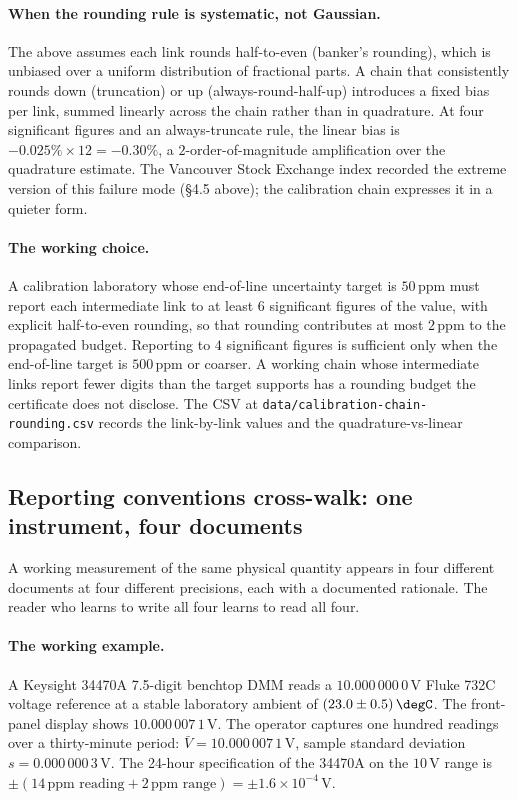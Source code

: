 \paragraph{When the rounding rule is systematic, not Gaussian.}
The above assumes each link rounds half-to-even (banker's
rounding), which is unbiased over a uniform distribution of
fractional parts. A chain that consistently rounds down
(truncation) or up (always-round-half-up) introduces a fixed
bias per link, summed linearly across the chain rather than in
quadrature. At four significant figures and an always-truncate
rule, the linear bias is $-0.025\% \times 12 = -0.30\%$, a
$2$-order-of-magnitude amplification over the quadrature
estimate. The Vancouver Stock Exchange index recorded the
extreme version of this failure mode (\S 4.5 above); the
calibration chain expresses it in a quieter form.

\paragraph{The working choice.} A calibration laboratory whose
end-of-line uncertainty target is $50\,\text{ppm}$ must report
each intermediate link to at least $6$ significant figures of
the value, with explicit half-to-even rounding, so that
rounding contributes at most $2\,\text{ppm}$ to the propagated
budget. Reporting to $4$ significant figures is sufficient only
when the end-of-line target is $500\,\text{ppm}$ or coarser.
A working chain whose intermediate links report fewer digits
than the target supports has a rounding budget the certificate
does not disclose. The CSV at \texttt{data/calibration-chain-
rounding.csv} records the link-by-link values and the
quadrature-vs-linear comparison.

\subsection{Reporting conventions cross-walk: one instrument,
four documents}

A working measurement of the same physical quantity appears in
four different documents at four different precisions, each
with a documented rationale. The reader who learns to write all
four learns to read all four.

\paragraph{The working example.} A Keysight 34470A 7.5-digit
benchtop DMM \cite{web:ch04t3b-keysight-34470a} reads a
$10.000\,000\,0\,\si{\volt}$ Fluke 732C voltage reference at
a stable laboratory ambient of $(23.0 \pm 0.5)\,\degC$. The
front-panel display shows $10.000\,007\,1\,\si{\volt}$. The
operator captures one hundred readings over a thirty-minute
period: $\bar{V} = 10.000\,007\,1\,\si{\volt}$, sample standard
deviation $s = 0.000\,000\,3\,\si{\volt}$. The 24-hour
specification of the 34470A on the $10\,\si{\volt}$ range is
$\pm (14\,\text{ppm reading} + 2\,\text{ppm range}) = \pm
1.6 \times 10^{-4}\,\si{\volt}$.

